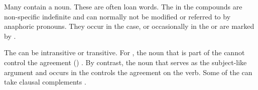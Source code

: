 Many  contain a noun. These  are often loan words. The  in the compounds are non-specific indefinite and can normally not be modified or referred to by anaphoric pronouns. They occur in the  case, or occasionally in the  or are marked by .

The  can be intransitive or transitive. For , the noun that is part of the  cannot control the agreement () . By contrast, the noun that serves as the subject-like argument and occurs in the  controls the  agreement on the verb. Some of the  can take clausal complements .
%
